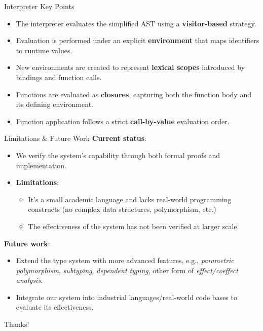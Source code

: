 \documentclass{beamer}
\begin{document}
\begin{frame}{Interpreter Key Points}
\begin{itemize}
    \item The interpreter evaluates the simplified AST using a \textbf{visitor-based} strategy.
    \item Evaluation is performed under an explicit \textbf{environment} that maps identifiers to runtime values.
    \item New environments are created to represent \textbf{lexical scopes} introduced by bindings and function calls.
    \item Functions are evaluated as \textbf{closures}, capturing both the function body and its defining environment.
    \item Function application follows a strict \textbf{call-by-value} evaluation order.
\end{itemize}
\end{frame}

\begin{frame}{Limitations \& Future Work}
    \textbf{Current status}:
    \begin{itemize}
        \item We verify the system's capability through both formal proofs and implementation.
        \item \textbf{Limitations}:
        \begin{itemize}
            \item It's a small academic language and lacks real-world programming constructs (no complex data structures, polymorphism, etc.)
            \item The effectiveness of the system has not been verified at larger scale.
        \end{itemize}
    \end{itemize}
    \textbf{Future work}:
    \begin{itemize}
        \item Extend the type system with more advanced features, e.g., \emph{parametric polymorphism}, \emph{subtyping}, \emph{dependent typing}, other form of \emph{effect/coeffect analysis}.
        \item Integrate our system into industrial languages/real-world code bases to evaluate its effectiveness.
    \end{itemize}
\end{frame}
   
\begin{frame}
    \begin{center}
        {\Huge Thanks!}
    \end{center}
\end{frame}
\end{document}
